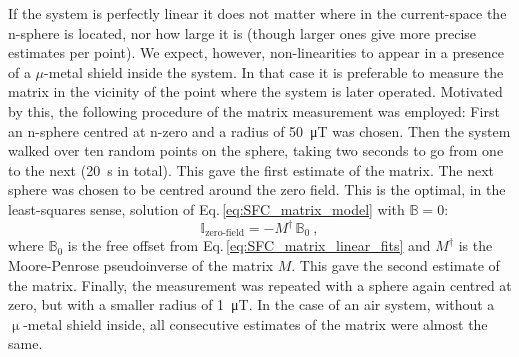 If the system is perfectly linear it does not matter where in the current-space the n-sphere is located, nor how large it is (though larger ones give more precise estimates per point). We expect, however, non-linearities to appear in a presence of a $\mu$-metal shield inside the system.
In that case it is preferable to measure the matrix in the vicinity of the point where the system is later operated. Motivated by this, the following procedure of the matrix measurement was employed: First an n-sphere centred at n-zero and a radius of \SI{50}{\micro\tesla} was chosen. Then the system walked over ten random points on the sphere, taking two seconds to go from one to the next (\SI{20}{\second} in total).
This gave the first estimate of the matrix. The next sphere was chosen to be centred around the zero field. This is the optimal, in the least-squares sense, solution of Eq.\,\ref{eq:SFC_matrix_model} with $\mathbb{B} = 0$:
\begin{equation}
  \label{eq:SFC_zero_field_requirement}
  \mathbb{I}_\text{zero-field} = - M^\dagger \, \mathbb{B}_0 \ ,
\end{equation}
where $\mathbb{B}_0$ is the free offset from Eq.\,\ref{eq:SFC_matrix_linear_fits} and $M^\dagger$ is the Moore-Penrose pseudoinverse of the matrix $M$. This gave the second estimate of the matrix. Finally, the measurement was repeated with a sphere again centred at zero, but with a smaller radius of \SI{1}{\micro\tesla}.
In the case of an air system, without a $\upmu$-metal shield inside, all consecutive estimates of the matrix were almost the same.

